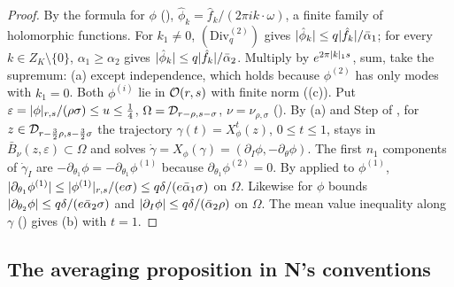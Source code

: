 \begin{proof}
\label{stepP:p2:sp-coef} By the formula for $\phi$ (), $\hat\phi_k=\hat f_k/(2\pi ik\cdot\omega)$, a finite family of holomorphic functions. For $k_1\ne0$, $(\mathrm{Div}^{(2)}_q)$ gives $\lvert \hat\phi_k\rvert\le q\lvert \hat f_k\rvert/\bar\alpha_1$; for every $k\in Z_K\setminus\{0\}$, $\alpha_1\ge\alpha_2$ gives $\lvert \hat\phi_k\rvert\le q\lvert \hat f_k\rvert/\bar\alpha_2$.
Multiply by $e^{2\pi\lvert k\rvert_1s}$, sum, take the supremum: (a) except independence, which holds because $\phi^{(2)}$ has only modes with $k_1=0$. Both $\phi^{(i)}$ lie in $\mathcal O(r,s)$ with finite norm ((c)).
\label{stepP:p2:sp-field} Put $\varepsilon=\lvert \phi\rvert_{r,s}/(\rho\sigma)\le u\le\frac14$, $\Omega=\mathcal D_{r-\rho,s-\sigma}$, $\nu=\nu_{\rho,\sigma}$ (). By (a) and Step  of , for $z\in\mathcal D_{r-\frac32\rho,s-\frac32\sigma}$ the trajectory $\gamma(t)=X^t_\phi(z)$, $0\le t\le1$, stays in $\bar B_\nu(z,\varepsilon)\subset\Omega$ and solves $\dot\gamma=X_\phi(\gamma)=(\partial_I\phi,-\partial_\theta\phi)$.
The first $n_1$ components of $\dot\gamma_I$ are $-\partial_{\theta_1}\phi=-\partial_{\theta_1}\phi^{(1)}$ because $\partial_{\theta_1}\phi^{(2)}=0$. By  applied to $\phi^{(1)}$, $\lvert \partial_{\theta_1}\phi^{(1)}\rvert\le\lvert \phi^{(1)}\rvert_{r,s}/(e\sigma)\le q\delta/(e\bar\alpha_1\sigma)$ on $\Omega$. Likewise  for $\phi$ bounds $\lvert \partial_{\theta_2}\phi\rvert\le q\delta/(e\bar\alpha_2\sigma)$ and $\lvert \partial_I\phi\rvert\le q\delta/(\bar\alpha_2\rho)$ on $\Omega$.
\label{stepP:p2:sp-int} The mean value inequality along $\gamma$ () gives (b) with $t=1$.
\end{proof}

\subsection{The averaging proposition in N's conventions}\label{bpP:p2:s-nfb}

